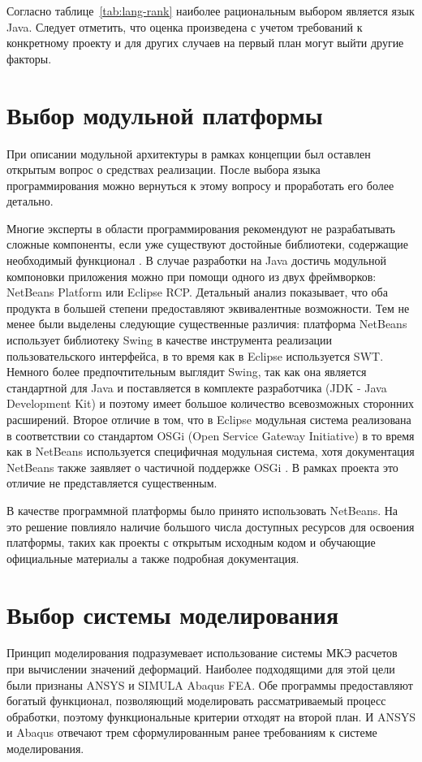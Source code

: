 \documentclass[14pt,oneside,final]{extreport}
\begin{document}
	Согласно таблице~\ref{tab:lang-rank} наиболее рациональным выбором является язык Java. Следует отметить, что оценка произведена с учетом требований к конкретному проекту и для других случаев на первый план могут выйти другие факторы.
	
	\section{Выбор модульной платформы}
	При описании модульной архитектуры в рамках концепции был оставлен открытым вопрос о средствах реализации. После выбора языка программирования можно вернуться к этому вопросу и проработать его более детально. 
	
	Многие эксперты в области программирования рекомендуют не разрабатывать сложные компоненты, если уже существуют достойные библиотеки, содержащие необходимый функционал \cite{Bloch}. В случае разработки на Java достичь модульной компоновки приложения можно при помощи одного из двух фреймворков: NetBeans Platform или Eclipse RCP. Детальный анализ показывает, что оба продукта в большей степени предоставляют эквивалентные возможности. Тем не менее были выделены следующие существенные различия: платформа NetBeans использует библиотеку Swing в качестве инструмента реализации пользовательского интерфейса, в то время как в Eclipse используется SWT. Немного более предпочтительным выглядит Swing, так как она является стандартной для Java и поставляется в комплекте разработчика (JDK - Java Development Kit) и поэтому имеет большое количество всевозможных сторонних расширений. Второе отличие в том, что в Eclipse модульная система реализована в соответствии со стандартом OSGi (Open Service Gateway Initiative) в то время как в NetBeans используется специфичная модульная система, хотя документация NetBeans также заявляет о частичной поддержке OSGi \cite{NetBeans}. В рамках проекта это отличие не представляется существенным. 
	
	В качестве программной платформы  было принято использовать NetBeans. На это решение повлияло наличие большого числа доступных ресурсов для освоения платформы, таких как проекты с открытым исходным кодом и обучающие официальные материалы а также подробная документация.

	\section{Выбор системы моделирования}
	Принцип моделирования подразумевает использование системы МКЭ расчетов при вычислении значений деформаций. Наиболее подходящими для этой цели были признаны ANSYS и SIMULA Abaqus FEA. Обе программы предоставляют богатый функционал, позволяющий моделировать рассматриваемый процесс обработки, поэтому функциональные критерии отходят на второй план. И ANSYS и Abaqus отвечают трем сформулированным ранее требованиям к системе моделирования. 
	
\end{document}
